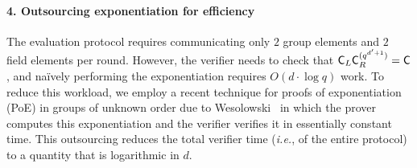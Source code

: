 \paragraph{4. Outsourcing exponentiation for efficiency}
The evaluation protocol requires communicating only $2$ group elements and $2$ field elements per round. However, the verifier needs to check that $\mathsf{C}_L\mathsf{C}_R^{(q^{d'+1})}=\mathsf{C}$, and naïvely performing the exponentiation requires $O(d \cdot \log q)$ work. To reduce this workload, we employ a recent technique for proofs of exponentiation (\textsf{PoE}) in groups of unknown order due to Wesolowski~\cite{EC:Wesolowski19} in which the prover computes this exponentiation and the verifier verifies it in essentially constant time. This outsourcing reduces the total verifier time (\emph{i.e.}, of the entire protocol) to a quantity that is logarithmic in $d$. %

